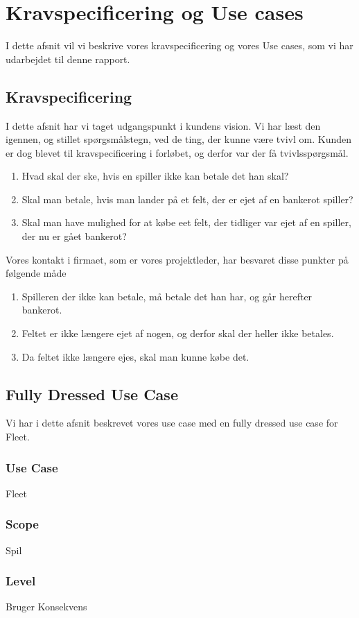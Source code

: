 \section{Kravspecificering og Use cases}
I dette afsnit vil vi beskrive vores kravspecificering og vores Use cases, som vi har udarbejdet til denne rapport.
\subsection{Kravspecificering}
I dette afsnit har vi taget udgangspunkt i kundens vision. Vi har læst den igennen, og stillet spørgsmålstegn, ved de ting, der kunne være tvivl om. Kunden er dog blevet til kravspecificering i forløbet, og derfor var der få tvivlsspørgsmål.
\begin{enumerate}
\item Hvad skal der ske, hvis en spiller ikke kan betale det han skal?
\item Skal man betale, hvis man lander på et felt, der er ejet af en bankerot spiller?
\item Skal man have mulighed for at købe eet felt, der tidliger var ejet af en spiller, der nu er gået bankerot?
\end{enumerate}
Vores kontakt i firmaet, som er vores projektleder, har besvaret disse punkter på følgende måde
\begin{enumerate}
\item Spilleren der ikke kan betale, må betale det han har, og går herefter bankerot.
\item Feltet er ikke længere ejet af nogen, og derfor skal der heller ikke betales.
\item Da feltet ikke længere ejes, skal man kunne købe det.
\end{enumerate}
\newpage
\subsection{Fully Dressed Use Case}
Vi har i dette afsnit beskrevet vores use case med en fully dressed use case for Fleet.
\subsubsection*{Use Case}
Fleet
\subsubsection*{Scope}
Spil
\subsubsection*{Level}
Bruger Konsekvens
